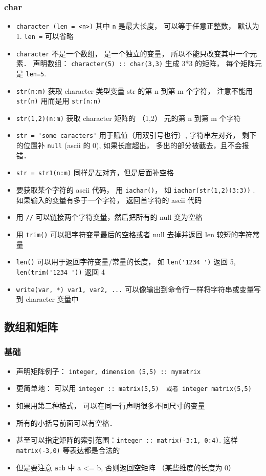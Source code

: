 \subsubsection{char}
\begin{itemize}
\item \verb`character (len = <n>)` 其中 \verb|n| 是最大长度， 可以等于任意正整数， 默认为 1.  \verb`len =` 可以省略
\item \verb|character| 不是一个数组， 是一个独立的变量， 所以不能只改变其中一个元素． 声明数组： \verb|character(5) :: char(3,3)| 生成 3*3 的矩阵， 每个矩阵元是 \verb|len=5|.
\item \verb`str(n:m)` 获取 character 类型变量 str 的第 n 到第 m 个字符， 注意不能用 \verb|str(n)| 用而是用 \verb|str(n:n)|
\item \verb`str(1,2)(n:m)` 获取 character 矩阵的 （1,2） 元的第 n 到第 m 个字符
\item \verb`str = 'some caracters'` 用于赋值（用双引号也行）, 字符串左对齐， 剩下的位置补 \verb|null| (ascii 的 0), 如果长度超出， 多出的部分被截去，且不会报错．
\item \verb|str = str1(n:m)| 同样是左对齐，但是后面补空格
\item 要获取某个字符的 ascii 代码， 用 \verb|iachar()|， 如 \verb|iachar(str(1,2)(3:3))| . 如果输入的变量有多于一个字符， 返回首字符的 ascii 代码
\item 用 \verb`//` 可以链接两个字符变量，然后把所有的 null 变为空格
\item 用 \verb`trim()` 可以把字符变量最后的空格或者 null 去掉并返回 len 较短的字符常量
\item \verb`len()` 可以用于返回字符变量/常量的长度， 如 \verb|len('1234 ')| 返回 5, \verb|len(trim('1234 '))| 返回 4
\item \verb`write(var, *) var1, var2, ...` 可以像输出到命令行一样将字符串或变量写到 character 变量中
\end{itemize}

\subsection{数组和矩阵}
\subsubsection{基础}
\begin{itemize}
\item 声明矩阵例子：  \verb`integer, dimension (5,5) :: mymatrix`
\item 更简单地： 可以用 \verb`integer :: matrix(5,5)  或者 integer matrix(5,5)`
\item 如果用第二种格式， 可以在同一行声明很多不同尺寸的变量
\item 所有的小括号前面可以有空格．
\item 甚至可以指定矩阵的索引范围：\verb|integer :: matrix(-3:1, 0:4)|. 这样 \verb|matrix(-3,0)| 等表达都是合法的
\item 但是要注意 \verb`a:b` 中 a <= b, 否则返回空矩阵 （某些维度的长度为 0）
\end{itemize}

